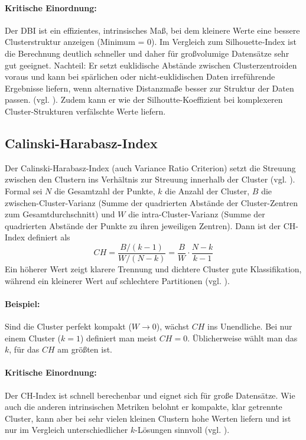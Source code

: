 \paragraph{Kritische Einordnung:} Der \ac{DBI} ist ein effizientes, intrinsisches Maß, bei dem kleinere Werte
eine bessere Clusterstruktur anzeigen (Minimum = 0). Im Vergleich zum Silhouette‐Index ist die Berechnung
deutlich schneller und daher für großvolumige Datensätze sehr gut geeignet.
Nachteil: Er setzt euklidische Abstände zwischen Clusterzentroiden voraus und kann bei spärlichen oder
nicht‑euklidischen Daten irreführende Ergebnisse liefern, wenn alternative Distanzmaße besser zur Struktur der Daten passen.
(vgl. \cite{Miller2024}). Zudem kann er wie der Silhoutte-Koeffizient bei komplexeren Cluster-Strukturen verfälschte Werte liefern.

\subsection{Calinski-Harabasz-Index} Der Calinski-Harabasz-Index (auch Variance
Ratio Criterion) setzt die Streuung zwischen den Clustern ins Verhältnis zur
Streuung innerhalb der Cluster (vgl. \cite{Calinski1974}). Formal
sei $N$ die Gesamtzahl der Punkte, $k$ die Anzahl der Cluster, $B$ die
zwischen-Cluster-Varianz (Summe der quadrierten Abstände der Cluster-Zentren
zum Gesamtdurchschnitt) und $W$ die intra-Cluster-Varianz (Summe der
quadrierten Abstände der Punkte zu ihren jeweiligen Zentren). Dann ist der
CH-Index definiert als 
\[
CH 
= \frac{B/(k-1)}{W/(N-k)}
= \frac{B}{W} \cdot \frac{N - k}{k - 1}
\]
Ein höherer Wert
zeigt klarere Trennung und dichtere Cluster gute Klassifikation, während ein
kleinerer Wert auf schlechtere Partitionen (vgl. \cite{Calinski1974}). 

\paragraph{Beispiel:} Sind die Cluster perfekt kompakt ($W\to0$), wächst $CH$ ins
Unendliche. Bei nur einem Cluster ($k=1$) definiert man meist $CH=0$.
Üblicherweise wählt man das $k$, für das $CH$ am größten ist.

\paragraph{Kritische Einordnung:} Der CH-Index ist schnell berechenbar und eignet
sich für große Datensätze. Wie auch die anderen intrinsischen Metriken belohnt er kompakte, klar getrennte Cluster, kann
aber bei sehr vielen kleinen Clustern hohe Werten liefern und ist nur im
Vergleich unterschiedlicher $k$-Lösungen sinnvoll (vgl. \cite{Miller2024}).

